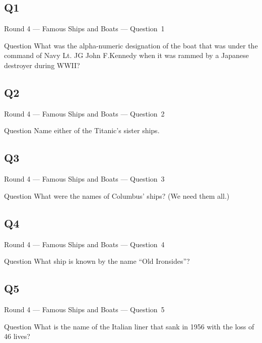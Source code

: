 \documentclass[11pt]{beamer}
\begin{document}
\subsection*{Q1}
\begin{frame}[t]{Round 4 --- Famous Ships and Boats --- \mbox{Question 1}}
\vspace{-0.5em}
\begin{block}{Question}
What was the alpha-numeric designation of the boat that was under the command of Navy Lt. JG John F.\@  Kennedy when it was rammed by a Japanese destroyer during WWII\@?
\end{block}
\end{frame}
\subsection*{Q2}
\begin{frame}[t]{Round 4 --- Famous Ships and Boats --- \mbox{Question 2}}
\vspace{-0.5em}
\begin{block}{Question}
Name either of the Titanic's sister ships.
\end{block}
\end{frame}
\subsection*{Q3}
\begin{frame}[t]{Round 4 --- Famous Ships and Boats --- \mbox{Question 3}}
\vspace{-0.5em}
\begin{block}{Question}
What were the names of Columbus' ships? (We need them all.)
\end{block}
\end{frame}
\subsection*{Q4}
\begin{frame}[t]{Round 4 --- Famous Ships and Boats --- \mbox{Question 4}}
\vspace{-0.5em}
\begin{block}{Question}
What ship is known by the name ``Old Ironsides''?
\end{block}
\end{frame}
\subsection*{Q5}
\begin{frame}[t]{Round 4 --- Famous Ships and Boats --- \mbox{Question 5}}
\vspace{-0.5em}
\begin{block}{Question}
What is the name of the Italian liner that sank in 1956 with the loss of 46 lives?
\end{block}
\end{frame}
\end{document}
